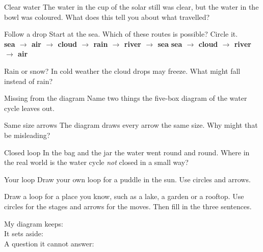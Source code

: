 \begin{puzzle}{Clear water}
The water in the cup of the solar still was clear, but the water in the bowl was coloured. What does this tell you about what travelled? \wline[6cm]
\end{puzzle}

\begin{puzzle}{Follow a drop}
Start at the sea. Which of these routes is possible? Circle it.\\
\textbf{sea $\to$ air $\to$ cloud $\to$ rain $\to$ river $\to$ sea} \qquad \textbf{sea $\to$ cloud $\to$ river $\to$ air}
\end{puzzle}

\clearpage

\begin{puzzle}{Rain or snow?}
In cold weather the cloud drops may freeze. What might fall instead of rain? \wline[3cm]
\end{puzzle}

\begin{puzzle}{Missing from the diagram}
Name two things the five-box diagram of the water cycle leaves out. \wline[6cm]
\end{puzzle}

\begin{puzzle}{Same size arrows}
The diagram draws every arrow the same size. Why might that be misleading? \wline[6cm]
\end{puzzle}

\begin{puzzle}{Closed loop}
In the bag and the jar the water went round and round. Where in the real world is the water cycle \emph{not} closed in a small way? \wline[6cm]
\end{puzzle}

\begin{puzzle}{Your loop}
Draw your own loop for a puddle in the sun. Use circles and arrows. \wline[5cm]
\begin{center}\end{center}
\end{puzzle}
\clearpage

\thispagestyle{fancy}
Draw a loop for a place you know, such as a lake, a garden or a rooftop. Use circles for the stages and arrows for the moves. Then fill in the three sentences.\par\medskip
\begin{center}\end{center}
My diagram keeps: \wline[8cm]\\[10pt]
It sets aside: \wline[8cm]\\[10pt]
A question it cannot answer: \wline[6.5cm]
\clearpage
